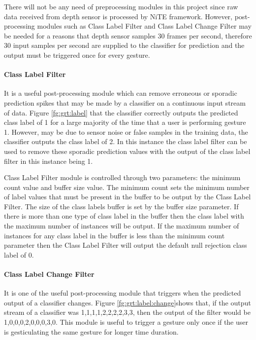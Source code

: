 There will not be any need of preprocessing modules in this project since raw data received from depth sensor is processed by NiTE framework. However, post-processing modules such as Class Label Filter and Class Label Change Filter may be needed for a reasons that depth sensor samples 30 frames per second, therefore 30 input samples per second are supplied to the classifier for prediction and the output must be triggered once for every gesture. 



\paragraph*{Class Label Filter} It is a useful post-processing module which can remove erroneous or sporadic prediction spikes that may be made by a classifier on a continuous input stream of data. Figure \ref{fg:grt:label} that the classifier correctly outputs the predicted class label of 1 for a large majority of the time that a user is performing gesture 1. However, may be due to sensor noise or false samples in the training data, the classifier outputs the class label of 2. In this instance the class label filter can be used to remove these sporadic prediction values with the output of the class label filter in this instance being 1. 

Class Label Filter module is controlled through two parameters: the minimum count value and buffer size value. The minimum count sets the minimum number of label values that must be present in the buffer to be output by the Class Label Filter. The size of the class labels buffer is set by the buffer size parameter. If there is more than one type of class label in the buffer then the class label with the maximum number of instances will be output. If the maximum number of instances for any class label in the buffer is less than the minimum count parameter then the Class Label Filter will output the default null rejection class label of 0.



\paragraph*{Class Label Change Filter} It is one of the useful post-processing module that triggers when the predicted output of a classifier changes. Figure \ref{fg:grt:label:change}shows that, if the output stream of a classifier was {1,1,1,1,2,2,2,2,3,3}, then the output of the filter would be {1,0,0,0,2,0,0,0,3,0}. This module is useful to trigger a gesture only once if the user is gesticulating the same gesture for longer time duration. 

